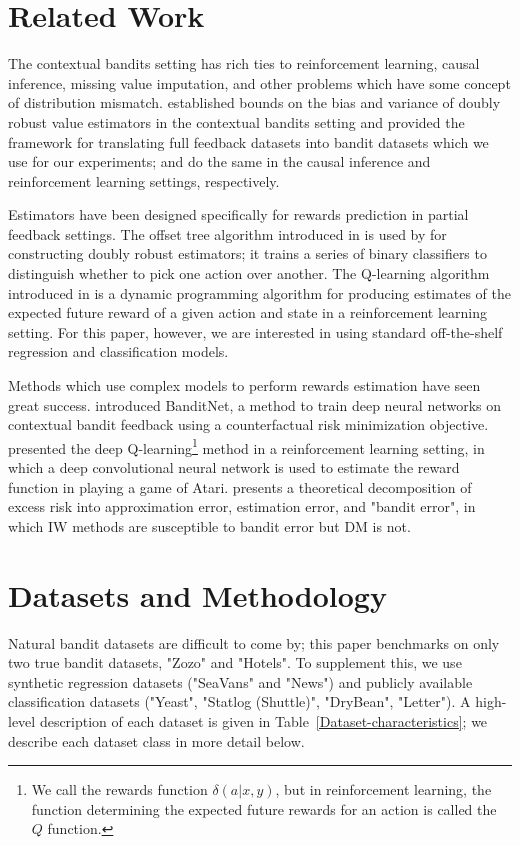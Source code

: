 \documentclass[sigplan,screen]{acmart}
\begin{document}
\section{Related Work}
The contextual bandits setting has rich ties to reinforcement learning, causal inference, missing value imputation, and other problems which have some concept of distribution mismatch. \cite{dudik} established bounds on the bias and variance of doubly robust value estimators in the contextual bandits setting and provided the framework for translating full feedback datasets into bandit datasets which we use for our experiments; \cite{kang_schafer} and \cite{jiang} do the same in the causal inference and reinforcement learning settings, respectively.

Estimators have been designed specifically for rewards prediction in partial feedback settings. The offset tree algorithm introduced in \cite{offset_tree} is used by \cite{dudik} for constructing doubly robust estimators; it trains a series of binary classifiers to distinguish whether to pick one action over another. The Q-learning algorithm introduced in \cite{Watkins92q-learning} is a dynamic programming algorithm for producing estimates of the expected future reward of a given action and state in a reinforcement learning setting. For this paper, however, we are interested in using standard off-the-shelf regression and classification models.

Methods which use complex models to perform rewards estimation have seen great success. \cite{joachims2018deep} introduced BanditNet, a method to train deep neural networks on contextual bandit feedback using a counterfactual risk minimization objective. \cite{deepq} presented the deep Q-learning\footnote{We call the rewards function $\delta(a|x,y)$, but in reinforcement learning, the function determining the expected future rewards for an action is called the $Q$ function.} method in a reinforcement learning setting, in which a deep convolutional neural network is used to estimate the reward function in playing a game of Atari. \cite{overparameterize1} presents a theoretical decomposition of excess risk into approximation error, estimation error, and "bandit error", in which IW methods are susceptible to bandit error but DM is not. 

\section{Datasets and Methodology}
Natural bandit datasets are difficult to come by; this paper benchmarks on only two true bandit datasets, "Zozo" and "Hotels". To supplement this, we use synthetic regression datasets ("SeaVans" and "News") and publicly available classification datasets ("Yeast", "Statlog (Shuttle)", "DryBean", "Letter"). A high-level description of each dataset is given in Table~\ref{Dataset-characteristics}; we describe each dataset class in more detail below.
\end{document}
